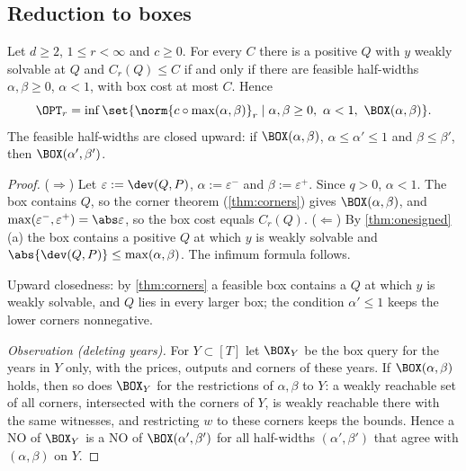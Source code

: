 \subsection{Reduction to boxes}
\begin{theorem}[reduction]\label{thm:reduction}
Let $d\ge2$, $1\le r<\infty$ and $c\ge0$. For every $C$ there is a positive $Q$ with $y$ weakly solvable at $Q$ and $C_r(Q)\le C$ if and only if there are feasible half-widths $\alpha,\beta\ge0$, $\alpha<1$, with box cost at most $C$. Hence
\[
\OPT_r=\inf\set{\norm{c\circ\max(\alpha,\beta)}_r\mid\alpha,\beta\ge0,\ \alpha<1,\ \BOX(\alpha,\beta)}.
\]
The feasible half-widths are closed upward: if $\BOX(\alpha,\beta)$, $\alpha\le\alpha'\le1$ and $\beta\le\beta'$, then $\BOX(\alpha',\beta')$.
\end{theorem}
\begin{proof}
($\Rightarrow$) Let $\varepsilon:=\dev(Q,P)$, $\alpha:=\varepsilon^-$ and $\beta:=\varepsilon^+$. Since $q>0$, $\alpha<1$. The box contains $Q$, so the corner theorem (\cref{thm:corners}) gives $\BOX(\alpha,\beta)$, and $\max(\varepsilon^-,\varepsilon^+)=\abs\varepsilon$, so the box cost equals $C_r(Q)$. ($\Leftarrow$) By \cref{thm:onesigned}(a) the box contains a positive $Q$ at which $y$ is weakly solvable and $\abs{\dev(Q,P)}\le\max(\alpha,\beta)$. The infimum formula follows.

Upward closedness: by \cref{thm:corners} a feasible box contains a $Q$ at which $y$ is weakly solvable, and $Q$ lies in every larger box; the condition $\alpha'\le1$ keeps the lower corners nonnegative.

\emph{Observation (deleting years).} For $Y\subset[T]$ let $\BOX_Y$ be the box query for the years in $Y$ only, with the prices, outputs and corners of these years. If $\BOX(\alpha,\beta)$ holds, then so does $\BOX_Y$ for the restrictions of $\alpha,\beta$ to $Y$: a weakly reachable set of all corners, intersected with the corners of $Y$, is weakly reachable there with the same witnesses, and restricting $w$ to these corners keeps the bounds. Hence a NO of $\BOX_Y$ is a NO of $\BOX(\alpha',\beta')$ for all half-widths $(\alpha',\beta')$ that agree with $(\alpha,\beta)$ on $Y$.
\end{proof}

